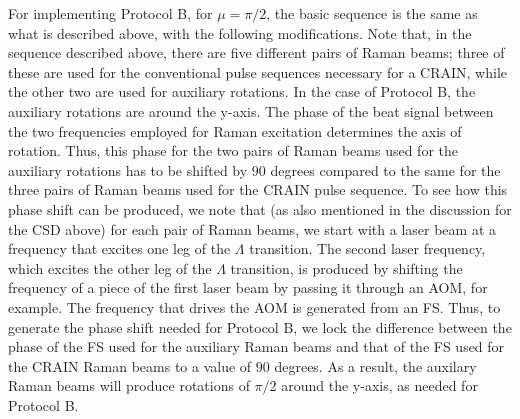 \documentclass[aps,pra,letterpaper,superscriptaddress,showpacs,amsmath,floats,twocolumn]{revtex4-1}
\begin{document}
For implementing Protocol B, for $\mu=\pi/2$, the basic sequence is the same as what is described above, with the following modifications. Note that, in the sequence described above, there are five different pairs of Raman beams; three of these are used for the conventional pulse sequences necessary for a CRAIN, while the other two are used for auxiliary rotations.  In the case of Protocol B, the auxiliary rotations are around the y-axis. The phase of the beat signal between the two frequencies employed for Raman excitation determines the axis of rotation. Thus, this phase for the two pairs of Raman beams used for the auxiliary rotations has to be shifted by $90$ degrees compared to the same for the three pairs of Raman beams used for the CRAIN pulse sequence. To see how this phase shift can be produced, we note that (as also mentioned in the discussion for the CSD above) for each pair of Raman beams, we start with a laser beam at a frequency that excites one leg of the $\Lambda$ transition. The second laser frequency, which excites the other leg of the $\Lambda$ transition, is produced by shifting the frequency of a piece of the first laser beam by passing it through an AOM, for example. The frequency that drives the AOM is generated from an FS. Thus, to generate the phase shift needed for Protocol B, we lock the difference between the phase of the FS used for the auxiliary Raman beams and that of the FS used for the CRAIN Raman beams to a value of $90$ degrees. As a result, the auxilary Raman beams will produce rotations of $\pi/2$ around the y-axis, as needed for Protocol B. 
\end{document}
